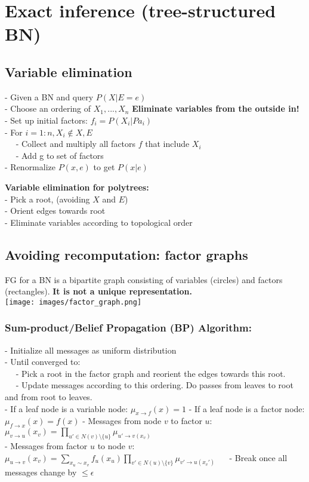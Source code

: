\section{Exact inference (tree-structured BN) }
\subsection{Variable elimination}
- Given a BN and query $P(X|E=e)$\\
- Choose an ordering of $X_1, ..., X_n$ \textbf{Eliminate variables from the outside in!}\\
- Set up initial factors: $f_i=P(X_i|Pa_i)$\\
- For $i=1:n, X_i \notin {X, E}$\\
$\quad$ - Collect and multiply all factors $f$ that include $X_i$\\
$\quad$ - Add g to set of factors\\
- Renormalize $P(x,e)$ to get $P(x|e)$

\textbf{Variable elimination for polytrees:}\\
- Pick a root, (avoiding $X$ and $E$)\\
- Orient edges towards root\\
- Eliminate variables according to topological order


\subsection{Avoiding recomputation: factor graphs}
FG for a BN is a bipartite graph consisting of variables (circles) and factors (rectangles). \textbf{It is not a unique representation.}\\
\texttt{[image: images/factor\_graph.png]}
\subsubsection{Sum-product/Belief Propagation (BP) Algorithm:}
- Initialize all messages as uniform distribution\\
- Until converged to:\\
$\quad$ - Pick a root in the factor graph and reorient the edges towards this root.\\
$\quad$ -  Update messages according to this ordering. Do passes from leaves to root and from root to leaves.\\
- If a leaf node is a variable node: 
$\mu_{x\rightarrow f}(x)=1$
- If a leaf node is a factor node:
$\mu_{f \rightarrow x}(x)=f(x)$
- Messages from node $v$ to factor $u$:\\
    $\mu_{v\rightarrow u}(x_v) = \prod_{u'\in N(v)\setminus \{u\}}\mu_{u'\rightarrow v(x_v)}$\\
- Messages from factor $u$ to node $v$:\\
    $\mu_{u\rightarrow v}(x_v) = \sum_{x_u\sim x_v}f_u(x_u) \prod_{v'\in N(u)\setminus \{v\}}\mu_{v'\rightarrow u(x_v')}$
$\quad$ -  Break once all messages change by $\leq \epsilon$

